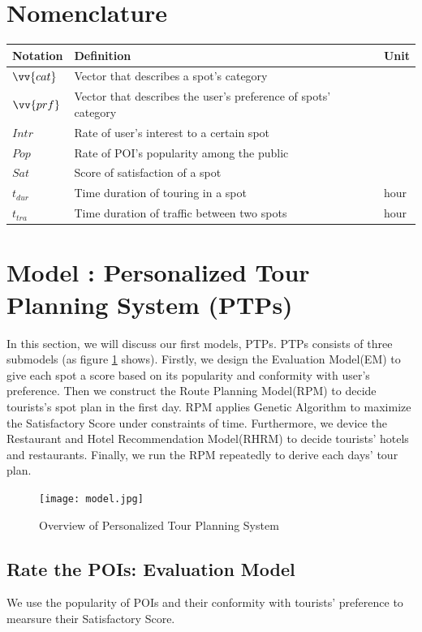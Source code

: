\documentclass{mcmthesis}
\newcommand{\RNum}[1]{\uppercase\expandafter{\romannumeral #1\relax}}
\begin{document}
\section{Nomenclature}
  \begin{tabular}{lll}    %
    \toprule
    Notation & Definition & Unit \\
    \midrule
    $\vv{cat}$ & Vector that describes a spot's category & \\
    $\vv{prf}$ & Vector that describes the user's preference of spots' category & \\
    $Intr$ & Rate of user's interest to a certain spot & \\
    $Pop$ & Rate of POI's popularity among the public & \\
    $Sat$ & Score of satisfaction of a spot & \\
    $t_{dur}$ & Time duration of touring in a spot & hour \\
    $t_{tra}$ & Time duration of traffic between two spots & hour \\
    \bottomrule
  \end{tabular}

\section{Model \RNum{1}: Personalized Tour Planning System (PTPs)} \label{section:model1}
  In this section, we will discuss our first models, PTPs. PTPs consists of three submodels (as figure \ref{fig:model} shows). Firstly, we design the Evaluation Model(EM) to give each spot a score based on its popularity and conformity with user's preference. Then we construct the Route Planning Model(RPM) to decide tourists's spot plan in the first day.  RPM applies Genetic Algorithm to maximize the Satisfactory Score under constraints of time. Furthermore, we device the Restaurant and Hotel Recommendation Model(RHRM) to decide tourists' hotels and restaurants. Finally, we run the RPM repeatedly to derive each days' tour plan.
  \begin{figure}[ht]
    \centering
    \texttt{[image: model.jpg]}
    \caption{Overview of Personalized Tour Planning System}
    \label{fig:model}
  \end{figure}
\subsection{Rate the POIs: Evaluation Model}
  We use the popularity of POIs and their conformity with tourists' preference to mearsure their Satisfactory Score.
  
\end{document}
